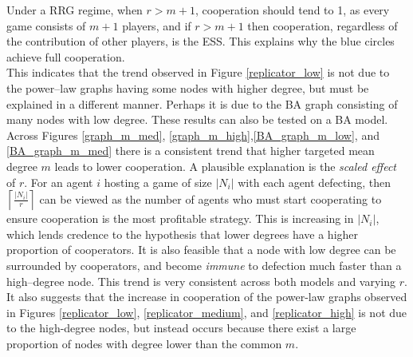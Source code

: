 Under a RRG regime, when $r>m+1$, cooperation should tend to 1, as every game consists of $m+1$ players, and if $r>m+1$ then cooperation, regardless of the contribution of other players, is the ESS. This explains why the blue circles achieve full cooperation. \\
This indicates that the trend observed in Figure \ref{replicator_low} is not due to the power--law graphs having some nodes with higher degree, but must be explained in a different manner. Perhaps it is due to the BA graph consisting of many nodes with low degree. These results can also be tested on a BA model. \\
\FloatBarrier
{}
\FloatBarrier
{}
\FloatBarrier
Across Figures \ref{graph_m_med}, \ref{graph_m_high},\ref{BA_graph_m_low}, and \ref{BA_graph_m_med} there is a consistent trend that higher targeted mean degree $m$ leads to lower cooperation. A plausible explanation is the \emph{scaled effect} of $r$. For an agent $i$ hosting a game of size $|N_i|$ with each agent defecting, then $\left\lceil \frac{|N_i|}{r}\right\rceil$ can be viewed as the number of agents who must start cooperating to ensure cooperation is the most profitable strategy. This is increasing in $|N_i|$, which lends credence to the hypothesis that lower degrees have a higher proportion of cooperators. It is also feasible that a node with low degree can be surrounded by cooperators, and become \emph{immune} to defection much faster than a high--degree node. This trend is very consistent across both models and varying $r$. \\

It also suggests that the increase in cooperation of the power-law graphs observed in Figures \ref{replicator_low}, \ref{replicator_medium}, and \ref{replicator_high} is not due to the high-degree nodes, but instead occurs because there exist a large proportion of nodes with degree lower than the common $m$.  \\

